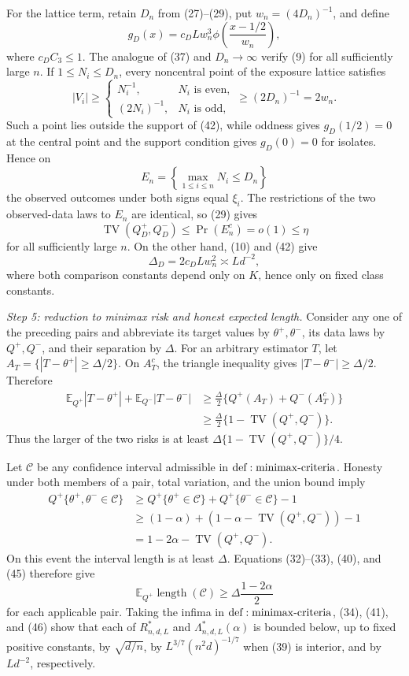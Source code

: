 For the lattice term, retain \(D_n\) from (27)--(29), put \(w_n=(4D_n)^{-1}\), and define
\[
 g_D(x)=c_D Lw_n^3\phi\!\left(\frac{x-1/2}{w_n}\right),
\tag{42}
\]
where \(c_DC_3\leq1\).  The analogue of (37) and \(D_n\to\infty\) verify (9) for all sufficiently large \(n\).  If \(1\leq N_i\leq D_n\), every noncentral point of the exposure lattice satisfies
\[
 |V_i|\geq
 \begin{cases}
 N_i^{-1},&N_i\text{ is even},\\
 (2N_i)^{-1},&N_i\text{ is odd},
 \end{cases}
 \geq(2D_n)^{-1}=2w_n.
\tag{43}
\]
Such a point lies outside the support of (42), while oddness gives \(g_D(1/2)=0\) at the central point and the support condition gives \(g_D(0)=0\) for isolates.  Hence on
\[
 E_n=\left\{\max_{1\leq i\leq n}N_i\leq D_n\right\}
\tag{44}
\]
the observed outcomes under both signs equal \(\xi_i\).  The restrictions of the two observed-data laws to \(E_n\) are identical, so (29) gives
\[
 \operatorname{TV}(Q_D^+,Q_D^-)
 \leq\Pr(E_n^c)=o(1)\leq\eta
\tag{45}
\]
for all sufficiently large \(n\).  On the other hand, (10) and (42) give
\[
 \Delta_D=2c_DLw_n^2\asymp Ld^{-2},
\tag{46}
\]
where both comparison constants depend only on \(K\), hence only on fixed class constants.

\textit{Step 5: reduction to minimax risk and honest expected length.}
Consider any one of the preceding pairs and abbreviate its target values by \(\theta^+,\theta^-\), its data laws by \(Q^+,Q^-\), and their separation by \(\Delta\).  For an arbitrary estimator \(T\), let \(A_T=\{|T-\theta^+|\geq\Delta/2\}\).  On \(A_T^c\), the triangle inequality gives \(|T-\theta^-|\geq\Delta/2\).  Therefore
\[
 \begin{aligned}
 \mathbb E_{Q^+}|T-\theta^+|+\mathbb E_{Q^-}|T-\theta^-|
 &\geq\frac\Delta2\{Q^+(A_T)+Q^-(A_T^c)\}\\
 &\geq\frac\Delta2\{1-\operatorname{TV}(Q^+,Q^-)\}.
 \end{aligned}
\tag{47}
\]
Thus the larger of the two risks is at least \(\Delta\{1-\operatorname{TV}(Q^+,Q^-)\}/4\).

Let \(\mathcal C\) be any confidence interval admissible in \({\rm def:minimax\text{-}criteria}\).  Honesty under both members of a pair, total variation, and the union bound imply
\[
 \begin{aligned}
 Q^+\{\theta^+,\theta^-\in\mathcal C\}
 &\geq Q^+\{\theta^+\in\mathcal C\}
       +Q^+\{\theta^-\in\mathcal C\}-1\\
 &\geq(1-\alpha)+(1-\alpha-\operatorname{TV}(Q^+,Q^-))-1\\
 &=1-2\alpha-\operatorname{TV}(Q^+,Q^-).
 \end{aligned}
\tag{48}
\]
On this event the interval length is at least \(\Delta\).  Equations (32)--(33), (40), and (45) therefore give
\[
 \mathbb E_{Q^+}\operatorname{length}(\mathcal C)
 \geq\Delta\frac{1-2\alpha}{2}
\tag{49}
\]
for each applicable pair.  Taking the infima in \({\rm def:minimax\text{-}criteria}\), (34), (41), and (46) show that each of \(R^*_{n,d,L}\) and \(\Lambda^*_{n,d,L}(\alpha)\) is bounded below, up to fixed positive constants, by \(\sqrt{d/n}\), by \(L^{3/7}(n^2d)^{-1/7}\) when (39) is interior, and by \(Ld^{-2}\), respectively.

